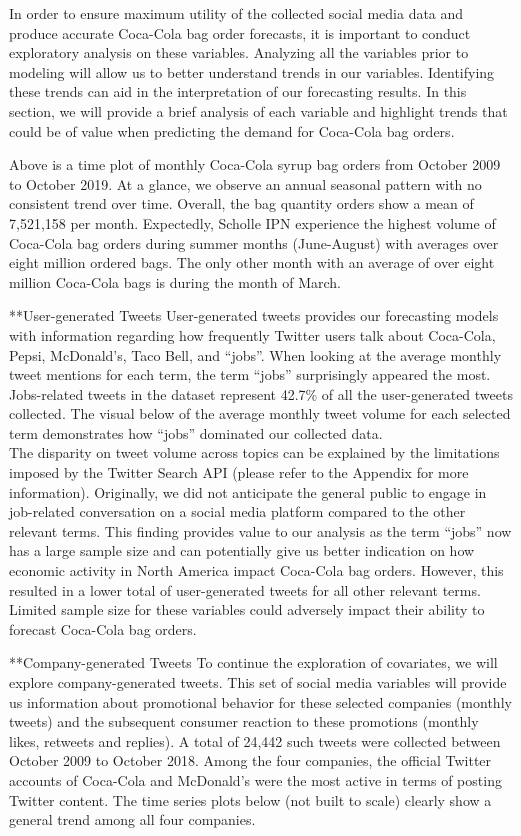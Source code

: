 \documentclass[12pt,oneside]{chicagocapstone}
\begin{document}
In order to ensure maximum utility of the collected social media data
and produce accurate Coca-Cola bag order forecasts, it is important to
conduct exploratory analysis on these variables. Analyzing all the
variables prior to modeling will allow us to better understand trends in
our variables. Identifying these trends can aid in the interpretation of
our forecasting results. In this section, we will provide a brief
analysis of each variable and highlight trends that could be of value
when predicting the demand for Coca-Cola bag orders.

Above is a time plot of monthly Coca-Cola syrup bag orders from October
2009 to October 2019. At a glance, we observe an annual seasonal pattern
with no consistent trend over time. Overall, the bag quantity orders
show a mean of 7,521,158 per month. Expectedly, Scholle IPN experience
the highest volume of Coca-Cola bag orders during summer months
(June-August) with averages over eight million ordered bags. The only
other month with an average of over eight million Coca-Cola bags is
during the month of March.

**User-generated Tweets User-generated tweets provides our forecasting
models with information regarding how frequently Twitter users talk
about Coca-Cola, Pepsi, McDonald's, Taco Bell, and ``jobs''. When
looking at the average monthly tweet mentions for each term, the term
``jobs'' surprisingly appeared the most. Jobs-related tweets in the
dataset represent 42.7\% of all the user-generated tweets collected. The
visual below of the average monthly tweet volume for each selected term
demonstrates how ``jobs'' dominated our collected data.\\
The disparity on tweet volume across topics can be explained by the
limitations imposed by the Twitter Search API (please refer to the
Appendix for more information). Originally, we did not anticipate the
general public to engage in job-related conversation on a social media
platform compared to the other relevant terms. This finding provides
value to our analysis as the term ``jobs'' now has a large sample size
and can potentially give us better indication on how economic activity
in North America impact Coca-Cola bag orders. However, this resulted in
a lower total of user-generated tweets for all other relevant terms.
Limited sample size for these variables could adversely impact their
ability to forecast Coca-Cola bag orders.

**Company-generated Tweets To continue the exploration of covariates, we
will explore company-generated tweets. This set of social media
variables will provide us information about promotional behavior for
these selected companies (monthly tweets) and the subsequent consumer
reaction to these promotions (monthly likes, retweets and replies). A
total of 24,442 such tweets were collected between October 2009 to
October 2018. Among the four companies, the official Twitter accounts of
Coca-Cola and McDonald's were the most active in terms of posting
Twitter content. The time series plots below (not built to scale)
clearly show a general trend among all four companies.
\end{document}
